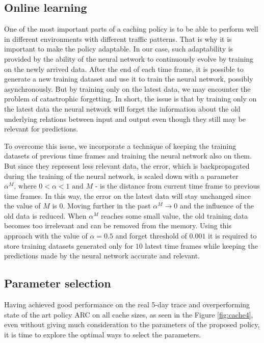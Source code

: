 \subsection{Online learning}

One of the most important parts of a caching policy is to be able to perform well in different environments with different traffic patterns. That is why it is important to make the policy adaptable. In our case, such adaptability is provided by the ability of the neural network to continuously evolve by training on the newly arrived data. After the end of each time frame, it is possible to generate a new training dataset and use it to train the neural network, possibly asynchronously. But by training only on the latest data, we may encounter the problem of catastrophic forgetting\cite{16, 17}. In short, the issue is that by training only on the latest data the neural network will forget the information about the old underlying relations between input and output even though they still may be relevant for predictions. 

To overcome this issue, we incorporate a technique of keeping the training datasets of previous time frames and training the neural network also on them. But since they represent less relevant data, the error, which is backpropagated during the training of the neural network, is scaled down with a parameter $\alpha^M \text{, where } 0 < \alpha < 1 \text{ and } M$ - is the distance from current time frame to previous time frames. In this way, the error on the latest data will stay unchanged since the value of $M$ is $0$. Moving further in the past $\alpha^M \rightarrow 0$ and the influence of the old data is reduced. When $\alpha^M$ reaches some small value, the old training data becomes too irrelevant and can be removed from the memory. Using this approach with the value of $\alpha = 0.5$ and forget threshold of $0.001$ it is required to store training datasets generated only for $10$ latest time frames while keeping the predictions made by the neural network accurate and relevant.

\subsection{Parameter selection}

Having achieved good performance on the real 5-day trace and overperforming state of the art policy ARC on all cache sizes, as seen in the Figure \ref{fig:cache4}, even without giving much consideration to the parameters of the proposed policy, it is time to explore the optimal ways to select the parameters.

